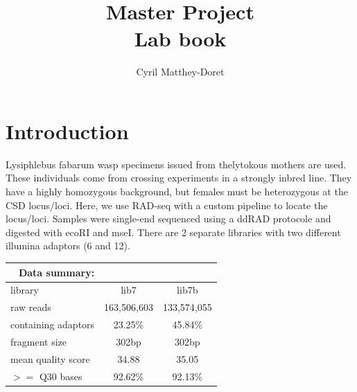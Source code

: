 \documentclass[10pt,a4paper]{report}
\author{Cyril Matthey-Doret}
\begin{document}
 \title{\textbf{Master Project}\\ Lab book}
 \maketitle
 \chapter{Introduction}
Lysiphlebus fabarum wasp specimens issued from thelytokous mothers are used. These individuals come from crossing experiments in a strongly inbred line. They have a highly homozygous background, but females must be heterozygous at the CSD locus/loci. Here, we use RAD-seq with a custom pipeline to locate the locus/loci. Samples were single-end sequenced using a ddRAD protocole and digested with ecoRI and mseI. There are 2 separate libraries with two different illumina adaptors (6 and 12).

\begin{center}
\begin{tabular}{l| c c}
 \multicolumn{1}{r}{Data summary:} \\
 \hline
library & lib7 & lib7b \\
raw reads & 163,506,603 & 133,574,055 \\
containing adaptors & 23.25\% & 45.84\% \\
fragment size & 302bp & 302bp \\
mean quality score & 34.88 & 35.05 \\
$>=$ Q30 bases & 92.62\% & 92.13\% \\

\end{tabular}
\end{center}
\end{document}
